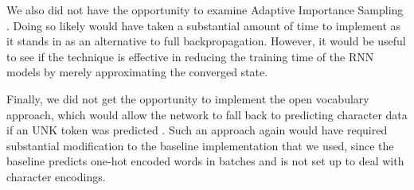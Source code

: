 \documentclass[a4paper]{article}
\begin{document}
We also did not have the opportunity to examine Adaptive Importance Sampling \cite{bengio08}. Doing so
likely would have taken a substantial amount of time to implement as it stands in as an alternative
to full backpropagation. However, it would be useful to see if the technique is effective in
reducing the training time of the RNN models by merely approximating the converged state.

Finally, we did not get the opportunity to implement the open vocabulary approach, which would allow
the network to fall back to predicting character data if an UNK token was predicted \cite{ling2016}. Such
an approach again would have required substantial modification to the baseline implementation that
we used, since the baseline predicts one-hot encoded words in batches and is not set up to deal with
character encodings.



\end{document}
